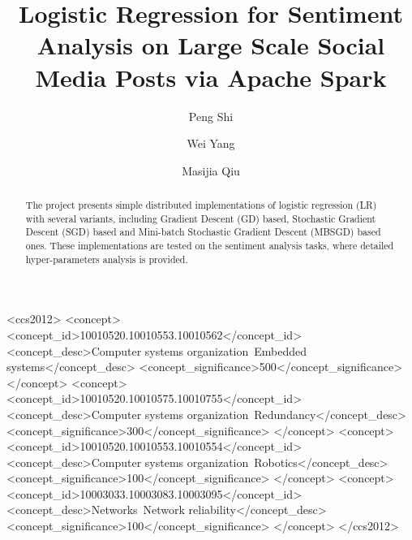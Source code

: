 \documentclass[sigconf]{acmart}
\begin{document}
\title{Logistic Regression for Sentiment Analysis on Large Scale Social Media Posts via Apache Spark}


\author{Peng Shi}

\author{Wei Yang}

\author{Masijia Qiu}




\begin{abstract}

The project presents simple distributed implementations of logistic regression (LR) with several variants, including Gradient Descent (GD) based, Stochastic Gradient Descent (SGD) based and Mini-batch Stochastic Gradient Descent (MBSGD) based ones. These implementations are tested on the sentiment analysis tasks, where detailed hyper-parameters analysis is provided. 

\end{abstract}
%
%
\begin{CCSXML}
<ccs2012>
 <concept>
  <concept_id>10010520.10010553.10010562</concept_id>
  <concept_desc>Computer systems organization~Embedded systems</concept_desc>
  <concept_significance>500</concept_significance>
 </concept>
 <concept>
  <concept_id>10010520.10010575.10010755</concept_id>
  <concept_desc>Computer systems organization~Redundancy</concept_desc>
  <concept_significance>300</concept_significance>
 </concept>
 <concept>
  <concept_id>10010520.10010553.10010554</concept_id>
  <concept_desc>Computer systems organization~Robotics</concept_desc>
  <concept_significance>100</concept_significance>
 </concept>
 <concept>
  <concept_id>10003033.10003083.10003095</concept_id>
  <concept_desc>Networks~Network reliability</concept_desc>
  <concept_significance>100</concept_significance>
 </concept>
</ccs2012>
\end{CCSXML}



\maketitle
\end{document}
